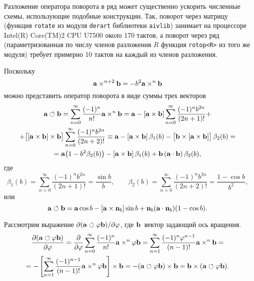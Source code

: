 Разложение оператора поворота в ряд может существенно ускорить численные схемы, использующие подобные конструкции. Так, поворот через матрицу 
(функция \verb'rotate' из модуля \verb'derart' библиотеки \verb'aivlib') занимает на процессоре {\sf Intel(R) Core(TM)2 CPU U7500} около 170 тактов,
а поворот через ряд (параметризованная по числу членов  разложения $R$ функция \verb'rotop<R>' из того же модуля) требует примерно 10 тактов 
на каждый из членов разложения.

Поскольку 
$$
{\bf a}\times^{n+2}{\bf b} = - b^2 {\bf a}\times^n{\bf b} 
$$
можно представить оператор поворота в виде суммы трех векторов
\begin{multline}
{\bf a}\circlearrowleft{\bf b} = \sum\limits_{n=0}^\infty \frac{(-1)^n}{n!} {\bf a}\times^n{\bf b} = 
{\bf a} - [{\bf a}\times{\bf b}] \sum\limits_{n=0}^\infty\frac{(-1)^n b^{2n}}{(2n+1)!} 
+\\+
\big[[{\bf a}\times{\bf b}]\times{\bf b}\big] \sum\limits_{n=0}^\infty\frac{(-1)^n b^{2n}}{(2n+2)!} 
\equiv
{\bf a} - [{\bf a}\times{\bf b}]\,\beta_1(b) - \big[{\bf b}\times[{\bf a}\times{\bf b}]\big]\, \beta_2(b)
=\\= 
{\bf a}\big(1-b^2\beta_2(b)\big) - [{\bf a}\times{\bf b}]\,\beta_1(b) + {\bf b}\,({\bf a}\cdot{\bf b})\,\beta_2(b),
\label{rotop:3v:rotop}
\end{multline}
где
$$
\beta_1(b) = \sum\limits_{n=0}^\infty\frac{(-1)^n b^{2n}}{(2n+1)!} = \frac{\sin b}b ,
\qquad
\beta_2(b) = \sum\limits_{n=0}^\infty\frac{(-1)^n b^{2n}}{(2n+2)!} = \frac{1-\cos b}{b^2},
$$
или
$$
{\bf a}\circlearrowleft{\bf b} = {\bf a} \cos b - [{\bf a}\times{\bf n}_b] \sin b + {\bf n}_b ({\bf a} \cdot {\bf n}_b)(1-\cos b).
$$


Рассмотрим выражение $\partial({\bf a}\circlearrowleft\varphi{\bf b})/\partial\varphi$, где ${\bf b}$~вектор задающий ось вращения.
\begin{multline}
\dfdx{(\a\rotop\varphi\b)} \varphi = \dfdx{}{\varphi}
\sum\limits_{n=0}^\infty \frac{(-1)^n}{n!} \a \times^n \varphi\b = 
\sum\limits_{n=1}^\infty \frac{(-1)^n\varphi^{n-1}}{(n-1)!} \a \times^n \b = \\ =
-\left[\sum\limits_{n=1}^\infty \frac{(-1)^{n-1}}{(n-1)!} \a \times^n\varphi\b\right]\times\b = 
-(\a\rotop\varphi\b)\times\b = \b \times(\a\rotop\varphi\b).
\notag%
\end{multline}

